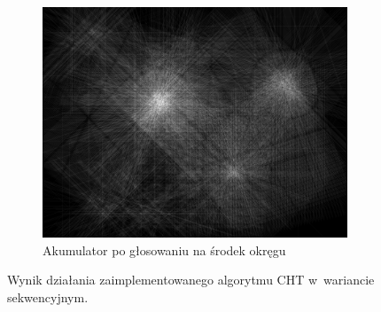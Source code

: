 \begin{figure}
    \begin{subfigure}{.475\linewidth}
      \includegraphics[width=\textwidth]{img/cht/sequential_acc.png}
      \caption{Akumulator po głosowaniu na środek okręgu}\label{fig:cht:acc}
    \end{subfigure}%
    \caption{Wynik działania zaimplementowanego algorytmu CHT w~wariancie sekwencyjnym.}
    \label{fig:cht}
  \end{figure}
  